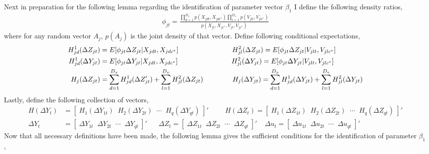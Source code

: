 \documentclass[10pt]{article}
\begin{document}
\noindent Next in preparation for the following lemma regarding the identification of parameter vector $\beta_1$ I define the following density ratios, 
\begin{align*} 
\phi_{jt} = \frac{ \prod_{d=1}^{D_x}p(X_{jdt},X_{jdc^*}) \prod_{l=1}^{D_v}p(V_{jlt},V_{jlc^*}) }{p(X_{jt},X_{jc^*},V_{jt},V_{jc^*})} 
\end{align*}
where for any random vector $A_{j}$, $p(A_{j})$ is the joint density of that vector. Define following conditional expectations, 
\begin{align*} 
H^1_{jd}(\Delta Z_{jt}) &= E[\phi_{jt} \Delta Z_{jt} |X_{jdt},X_{jdc^*}] \hspace{2.75cm}  H^2_{jl}(\Delta Z_{jt}) = E[\phi_{jt} \Delta Z_{jt} |V_{jlt},V_{jlc^*}] \\
%
H^1_{jd}(\Delta Y_{jt}) &= E[\phi_{jt} \Delta Y_{jt} |X_{jdt},X_{jdc^*}] \hspace{2.75cm} H^2_{jl}(\Delta Y_{jt}) = E[\phi_{jt} \Delta Y_{jt} |V_{jlt},V_{jlc^*}] \\
%
H_j(\Delta Z_{jt}) &= \sum_{d=1}^{D_x} H^1_{jd}(\Delta Z_{jt}') + \sum_{l=1}^{D_v} H^2_{jl}(\Delta Z_{jt})  \hspace{1.5cm}
%
H_j(\Delta Y_{jt}) = \sum_{d=1}^{D_x} H^1_{jd}(\Delta Y_{jt}) + \sum_{l=1}^{D_v} H^2_{jl}(\Delta Y_{jt}) 
\end{align*} 
Lastly, define the following collection of vectors, 
\begin{align*}
H(\Delta Y_t)  &= [ \; H_1(\Delta Y_{1t}) \;\; H_2(\Delta Y_{2t}) \;\; \cdots \;\; H_q(\Delta Y_{qt}) \; ]'
\hspace{1cm} 
H(\Delta Z_t)  = [ \; H_1(\Delta Z_{1t}) \;\; H_2(\Delta Z_{2t}) \;\; \cdots \;\; H_q(\Delta Z_{qt}) \; ]' \\
%
\Delta Y_t &= [ \; \Delta Y_{1t} \;\;  \Delta Y_{2t} \;\; \cdots \;\; \Delta Y_{qt} \;] '  \;\;\;\;\;\; \Delta Z_t = [ \; \Delta Z_{1t} \;\;  \Delta Z_{2t} \;\; \cdots \;\; \Delta Z_{qt} \;] ' 
\;\;\;\; \Delta u_t =  [ \; \Delta u_{1t} \;\;  \Delta u_{2t} \;\; \cdots \;\; \Delta u_{qt} \;] ' 
\end{align*}
Now that all necessary definitions have been made, the following lemma gives the sufficient conditions for the identification of parameter $\beta_1$, 
\end{document}
